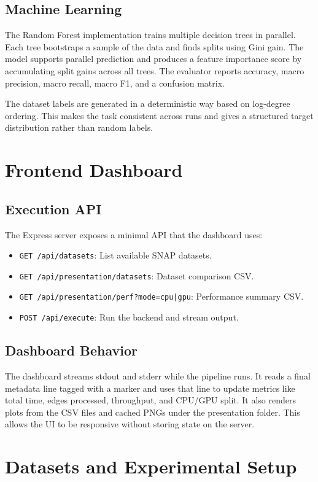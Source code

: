 \documentclass[11pt]{article}
\let\oldsection\section
\renewcommand{\section}{\clearpage\oldsection}
\begin{document}
\subsection{Machine Learning}
The Random Forest implementation trains multiple decision trees in parallel. Each tree bootstraps a sample of the data and finds splits using Gini gain. The model supports parallel prediction and produces a feature importance score by accumulating split gains across all trees. The evaluator reports accuracy, macro precision, macro recall, macro F1, and a confusion matrix.

The dataset labels are generated in a deterministic way based on log-degree ordering. This makes the task consistent across runs and gives a structured target distribution rather than random labels.

\section{Frontend Dashboard}
\subsection{Execution API}
The Express server exposes a minimal API that the dashboard uses:
\begin{itemize}
  \item \texttt{GET /api/datasets}: List available SNAP datasets.
  \item \texttt{GET /api/presentation/datasets}: Dataset comparison CSV.
  \item \texttt{GET /api/presentation/perf?mode=cpu|gpu}: Performance summary CSV.
  \item \texttt{POST /api/execute}: Run the backend and stream output.
\end{itemize}

\subsection{Dashboard Behavior}
The dashboard streams stdout and stderr while the pipeline runs. It reads a final metadata line tagged with a marker and uses that line to update metrics like total time, edges processed, throughput, and CPU/GPU split. It also renders plots from the CSV files and cached PNGs under the presentation folder. This allows the UI to be responsive without storing state on the server.

\section{Datasets and Experimental Setup}
\end{document}
